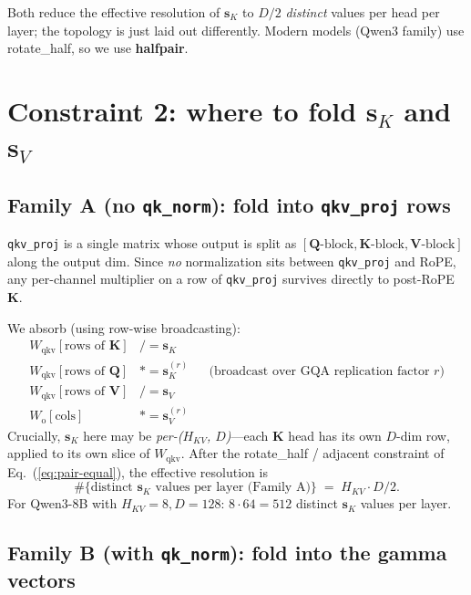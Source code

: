 \documentclass[11pt]{article}
\newcommand{\sk}{\mathbf{s}_K}
\newcommand{\sv}{\mathbf{s}_V}
\newcommand{\K}{\mathbf{K}}
\newcommand{\Q}{\mathbf{Q}}
\newcommand{\V}{\mathbf{V}}
\begin{document}
Both reduce the effective resolution of $\sk$ to $D/2$ \emph{distinct}
values per head per layer; the topology is just laid out differently.
Modern models (Qwen3 family) use rotate\_half, so we use \textbf{halfpair}.

\section{Constraint 2: where to fold $\sk$ and $\sv$}

\subsection{Family A (no \texttt{qk\_norm}): fold into \texttt{qkv\_proj} rows}

\texttt{qkv\_proj} is a single matrix whose output is split as
$[\Q\text{-block}, \K\text{-block}, \V\text{-block}]$ along the
output dim. Since \emph{no} normalization sits between \texttt{qkv\_proj}
and RoPE, any per-channel multiplier on a row of \texttt{qkv\_proj}
survives directly to post-RoPE $\K$.

We absorb (using row-wise broadcasting):
\begin{align}
W_{\mathrm{qkv}}[\text{rows of } \K] &\mathrel{/{=}} \sk \nonumber \\
W_{\mathrm{qkv}}[\text{rows of } \Q] &\mathrel{*{=}} \sk^{(r)}
   && \text{(broadcast over GQA replication factor $r$)} \nonumber \\
W_{\mathrm{qkv}}[\text{rows of } \V] &\mathrel{/{=}} \sv \nonumber \\
W_{\mathrm{o}}[\text{cols}]          &\mathrel{*{=}} \sv^{(r)}
\label{eq:fold-A}
\end{align}
Crucially, $\sk$ here may be \emph{per-($H_{KV}$, $D$)}---each $\K$ head
has its own $D$-dim row, applied to its own slice of $W_{\mathrm{qkv}}$.
After the rotate\_half / adjacent constraint of Eq.~(\ref{eq:pair-equal}),
the effective resolution is
\begin{equation}
\#\{\text{distinct } \sk \text{ values per layer (Family A)}\}
\;=\; H_{KV} \cdot D/2 .
\label{eq:resolution-A}
\end{equation}
For Qwen3-8B with $H_{KV}=8, D=128$: \textbf{$8 \cdot 64 = 512$} distinct
$\sk$ values per layer.

\subsection{Family B (with \texttt{qk\_norm}): fold into the gamma vectors}
\end{document}
